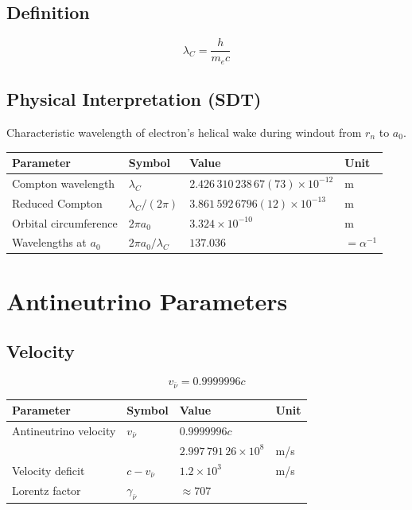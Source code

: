 \documentclass{article}
\begin{document}
\subsection{Definition}

\begin{equation}
\lambda_C = \frac{h}{m_e c}
\end{equation}

\subsection{Physical Interpretation (SDT)}

Characteristic wavelength of electron's helical wake during windout from $r_n$ to $a_0$.

\begin{longtable}{llll}
\toprule
\textbf{Parameter} & \textbf{Symbol} & \textbf{Value} & \textbf{Unit} \\
\midrule
Compton wavelength & $\lambda_C$ & $2.426\,310\,238\,67(73) \times 10^{-12}$ & m \\
Reduced Compton & $\lambda_C/(2\pi)$ & $3.861\,592\,6796(12) \times 10^{-13}$ & m \\
Orbital circumference & $2\pi a_0$ & $3.324 \times 10^{-10}$ & m \\
Wavelengths at $a_0$ & $2\pi a_0/\lambda_C$ & $137.036$ & $= \alpha^{-1}$ \\
\bottomrule
\end{longtable}

\section{Antineutrino Parameters}

\subsection{Velocity}

\begin{equation}
v_{\bar{\nu}} = 0.9999996c
\end{equation}

\begin{longtable}{llll}
\toprule
\textbf{Parameter} & \textbf{Symbol} & \textbf{Value} & \textbf{Unit} \\
\midrule
Antineutrino velocity & $v_{\bar{\nu}}$ & $0.9999996c$ & \\
& & $2.997\,791\,26 \times 10^8$ & m/s \\
Velocity deficit & $c - v_{\bar{\nu}}$ & $1.2 \times 10^3$ & m/s \\
Lorentz factor & $\gamma_{\bar{\nu}}$ & $\approx 707$ & \\
\bottomrule
\end{longtable}
\end{document}
